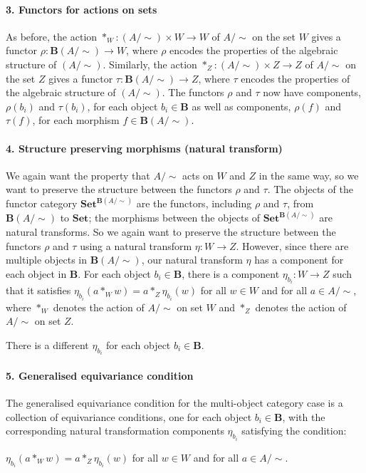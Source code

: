 \paragraph{3. Functors for actions on sets}
As before, the action $*_{W}: (A/\sim) \times W \to W$ of $A/\sim$ on the set $W$ gives a functor $\rho: \textbf{B}(A/\sim) \to W$, where $\rho$ encodes the properties of the algebraic structure of $(A/\sim)$.
Similarly, the action $*_{Z}: (A/\sim) \times Z \to Z$ of $A/\sim$ on the set $Z$ gives a functor $\tau: \textbf{B}(A/\sim) \to Z$, where $\tau$ encodes the properties of the algebraic structure of $(A/\sim)$.
The functors $\rho$ and $\tau$ now have components, $\rho(b_{i})$ and $\tau(b_{i})$, for each object $b_{i} \in \textbf{B}$ as well as components, $\rho(f)$ and $\tau(f)$, for each morphism $f \in \textbf{B}(A/\sim)$.

\paragraph{4. Structure preserving morphisms (natural transform)}
We again want the property that $A/\sim$ acts on $W$ and $Z$ in the same way, so we want to preserve the structure between the functors $\rho$ and $\tau$.
The objects of the functor category $\textbf{Set}^{\textbf{B}(A/\sim)}$ are the functors, including $\rho$ and $\tau$, from $\textbf{B}(A/\sim)$ to $\textbf{Set}$; the morphisms between the objects of $\textbf{Set}^{\textbf{B}(A/\sim)}$ are natural transforms.
So we again want to preserve the structure between the functors $\rho$ and $\tau$ using a natural transform $\eta: W \to Z$.
However, since there are multiple objects in $\textbf{B}(A/\sim)$, our natural transform $\eta$ has a component for each object in $\textbf{B}$.
For each object $b_{i} \in \textbf{B}$, there is a component $\eta_{b_{i}}: W \to Z$ such that it satisfies $\eta_{b_{i}}(a *_{W} w) = a *_{Z} \eta_{b_{i}}(w)$ for all $w \in W$ and for all $a \in A/\sim$, where $*_{W}$ denotes the action of $A/\sim$ on set $W$ and $*_{Z}$ denotes the action of $A/\sim$ on set $Z$.

\begin{remark}
   There is a different $\eta_{b_{i}}$ for each object $b_{i} \in \textbf{B}$.
\end{remark}

\paragraph{5. Generalised equivariance condition}
 The generalised equivariance condition for the multi-object category case is a collection of equivariance conditions, one for each object $b_{i} \in \textbf{B}$, with the corresponding natural transformation components $\eta_{b_i}$ satisfying the condition:
 \begin{center}
      $\eta_{b_i}(a *_{W} w) = a *_{Z} \eta_{b_i}(w)$ for all $w \in W$ and for all $a \in A/\sim$.
 \end{center}

